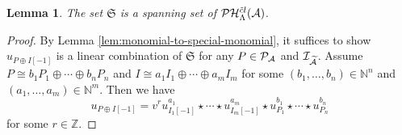 \documentclass[reqno,12pt]{amsart}
\numberwithin{equation}{section}
\theoremstyle{plain} %
\newtheorem{lemma}[theorem]{\bf Lemma}
\theoremstyle{definition} %
\begin{document}
\begin{lemma}\label{yl5.9}
    The set $\mathfrak{S}$ is a spanning set of $\mathcal {P}\mathcal {H}_\Lambda^{{\tilde{c}l}}({\mathcal{A}})$.
\end{lemma}
\begin{proof}
By Lemma \ref{lem:monomial-to-special-monomial}, it suffices to show $u_{P\oplus I[-1]}$ is a linear combination of $\mathfrak{S}$ for any $P\in \mathcal{P}_{\mathcal{A}}$ and $\mathcal{I}_{\widetilde{\mathcal{A}}}$.
Assume $P\cong b_1P_1\oplus \cdots \oplus b_nP_n$ and $I\cong a_1I_1\oplus \cdots \oplus a_mI_m$ for some $(b_1,\ldots,b_n)\in \mathbb{N}^n$ and $(a_1,\ldots, a_m)\in \mathbb{N}^m$. Then we have
\begin{equation}\label{upi-1}
u_{P\oplus I[-1]}=v^ru_{I_1[-1]}^{a_1}\star \cdots\star u_{I_m[-1]}^{a_m}\star u_{P_1}^{b_1}\star \cdots \star u_{P_n}^{b_n}\end{equation} for some $r\in\mathbb{Z}$.


\end{proof}
\end{document}

